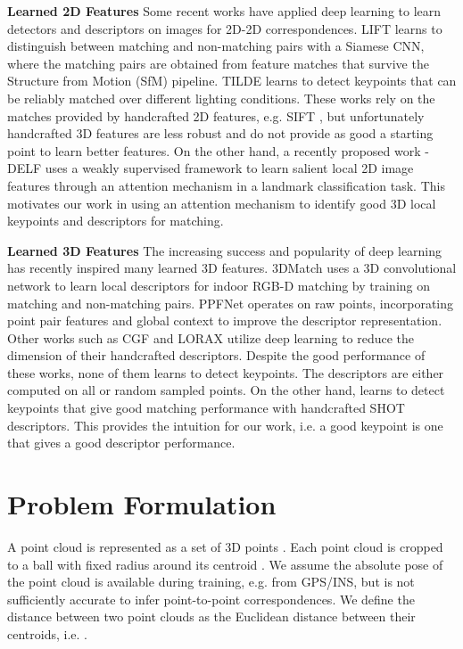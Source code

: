 \documentclass[runningheads]{llncs}
\begin{document}
\medskip
\noindent \textbf{Learned 2D Features} \enskip
Some recent works have applied deep learning to learn detectors and descriptors on images for 2D-2D correspondences. LIFT \cite{yi2016lift} learns to distinguish between matching and non-matching pairs with a Siamese CNN, 
where the matching pairs are obtained from feature matches that survive the Structure from Motion (SfM) pipeline. TILDE \cite{tilde2015} learns to detect keypoints that can be reliably matched over different lighting conditions. These works rely on the matches provided by handcrafted 2D features, e.g. SIFT \cite{SIFT}, but unfortunately handcrafted 3D features are less robust and do not provide as good a starting point to learn better features. On the other hand, a recently proposed work - DELF \cite{delf} uses a weakly supervised framework to learn salient local 2D image features through an attention mechanism in a landmark classification task. This motivates our work in using an attention mechanism to identify good 3D local keypoints and descriptors for matching. 

\medskip
\noindent \textbf{Learned 3D Features} \enskip
The increasing success and popularity of deep learning has recently inspired many learned 3D features.
3DMatch \cite{zeng20163dmatch} uses a 3D convolutional network to learn local descriptors for indoor RGB-D matching by training on matching and non-matching pairs. PPFNet \cite{ppfnet} operates on raw points, incorporating point pair features and global context to improve the descriptor representation. Other works such as CGF \cite{CGF} and LORAX \cite{Elbaz2017CVPR} utilize deep learning to reduce the dimension of their handcrafted descriptors.
Despite the good performance of these works, none of them learns to detect keypoints. The descriptors are either computed on all or random sampled points. On the other hand, \cite{DescriptorSpecificDetector15} learns to detect keypoints that give good matching performance with handcrafted SHOT \cite{SHOT} descriptors. This provides the intuition for our work, i.e. a good keypoint is one that gives a good descriptor performance.

\section{Problem Formulation}
A point cloud  is represented as a set of  3D points . 
Each point cloud  is cropped to a ball with fixed radius  around its centroid . We assume the absolute pose of the point cloud is available during training, e.g. from GPS/INS, but is not sufficiently accurate to infer point-to-point correspondences. We define the distance between two point clouds  as the Euclidean distance between their centroids, i.e. . 
\end{document}
